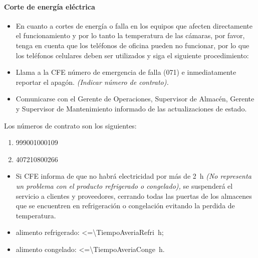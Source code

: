 \paragraph{Corte de energía eléctrica}
\begin{itemize}
	\item En cuanto a cortes de energía o falla en los equipos que afecten directamente el funcionamiento y por lo tanto la temperatura de las cámaras, por favor, tenga en cuenta que los teléfonos de oficina pueden no funcionar, por lo que los teléfonos celulares deben ser utilizados y siga el siguiente procedimiento:
	\item Llama a la \gls{CFE} número de emergencia de falla (071) e inmediatamente reportar el apagón. \emph{(Indicar número de contrato).}
	\item Comunicarse con el Gerente de Operaciones, Supervisor de Almacén, Gerente y Supervisor de Mantenimiento informado de las actualizaciones de estado.
\end{itemize}

\begin{note} \label{note:NumerosDeContratoCFE}
	Los números de contrato son los siguientes:
	\begin{enumerate}
		\item 999001000109
		\item 407210800266
	\end{enumerate}
\end{note}

\begin{itemize}
	\item Si \gls{CFE} informa de que no habrá electricidad por más de \qty{2}{\hour} \emph{(No representa un problema con el producto refrigerado o congelado),} se suspenderá el servicio a clientes y proveedores, cerrando todas las puertas de los almacenes que se encuentren en refrigeración o congelación evitando la perdida de temperatura.
\end{itemize}

\begin{note} \label{note:TMaxCamAveriada}
	\begin{itemize}
		\item \Gls{alimento} refrigerado: \qty{<=\TiempoAveriaRefri}{\hour};
		\item \Gls{alimento} congelado: \qty{<=\TiempoAveriaConge}{\hour}.
	\end{itemize}
\end{note}

